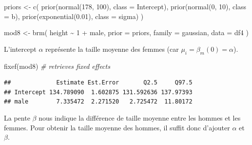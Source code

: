 \documentclass[
  a4paper,11pt,twoside,onecolumn,openright,final,oldfontcommands]{memoir}
\newenvironment{Shaded}{\begin{snugshade}}{\end{snugshade}}
\newcommand{\AttributeTok}[1]{\textcolor[rgb]{0.77,0.63,0.00}{#1}}
\newcommand{\CommentTok}[1]{\textcolor[rgb]{0.56,0.35,0.01}{\textit{#1}}}
\newcommand{\DecValTok}[1]{\textcolor[rgb]{0.00,0.00,0.81}{#1}}
\newcommand{\FloatTok}[1]{\textcolor[rgb]{0.00,0.00,0.81}{#1}}
\newcommand{\FunctionTok}[1]{\textcolor[rgb]{0.00,0.00,0.00}{#1}}
\newcommand{\NormalTok}[1]{#1}
\newcommand{\OtherTok}[1]{\textcolor[rgb]{0.56,0.35,0.01}{#1}}
\newcommand{\SpecialCharTok}[1]{\textcolor[rgb]{0.00,0.00,0.00}{#1}}
\theoremstyle{definition}
\theoremstyle{definition}
\theoremstyle{definition}
\theoremstyle{remark}
\begin{document}
\begin{Shaded}
\begin{Highlighting}[]
\NormalTok{priors }\OtherTok{\textless{}{-}} \FunctionTok{c}\NormalTok{(}
  \FunctionTok{prior}\NormalTok{(}\FunctionTok{normal}\NormalTok{(}\DecValTok{178}\NormalTok{, }\DecValTok{100}\NormalTok{), }\AttributeTok{class =}\NormalTok{ Intercept),}
  \FunctionTok{prior}\NormalTok{(}\FunctionTok{normal}\NormalTok{(}\DecValTok{0}\NormalTok{, }\DecValTok{10}\NormalTok{), }\AttributeTok{class =}\NormalTok{ b),}
  \FunctionTok{prior}\NormalTok{(}\FunctionTok{exponential}\NormalTok{(}\FloatTok{0.01}\NormalTok{), }\AttributeTok{class =}\NormalTok{ sigma)}
\NormalTok{  )}

\NormalTok{mod8 }\OtherTok{\textless{}{-}} \FunctionTok{brm}\NormalTok{(}
\NormalTok{  height }\SpecialCharTok{\textasciitilde{}} \DecValTok{1} \SpecialCharTok{+}\NormalTok{ male,}
  \AttributeTok{prior =}\NormalTok{ priors,}
  \AttributeTok{family =}\NormalTok{ gaussian,}
  \AttributeTok{data =}\NormalTok{ df4}
\NormalTok{  )}
\end{Highlighting}
\end{Shaded}

L'intercept \(\alpha\) représente la taille moyenne des femmes (car \(\mu_{i} = \beta_{m}(0) = \alpha\)).

\begin{Shaded}
\begin{Highlighting}[]
\FunctionTok{fixef}\NormalTok{(mod8) }\CommentTok{\# retrieves fixed effects}
\end{Highlighting}
\end{Shaded}

\begin{verbatim}
##             Estimate Est.Error       Q2.5     Q97.5
## Intercept 134.789090  1.602875 131.592636 137.97393
## male        7.335472  2.271520   2.725472  11.80172
\end{verbatim}

La pente \(\beta\) nous indique la différence de taille moyenne entre les hommes et les femmes. Pour obtenir la taille moyenne des hommes, il suffit donc d'ajouter \(\alpha\) et \(\beta\).

\begin{Shaded}
\end{Shaded}
\end{document}
